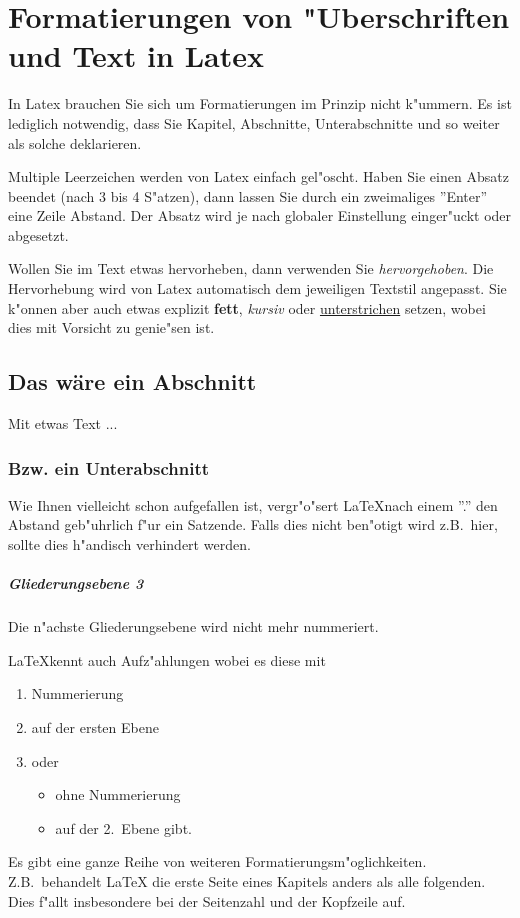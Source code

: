 \chapter[Formatierungen]{Formatierungen von "Uberschriften und Text in Latex}

In Latex brauchen Sie sich um Formatierungen im Prinzip nicht k"ummern. Es ist lediglich notwendig, dass Sie Kapitel, Abschnitte, Unterabschnitte und so weiter als solche deklarieren.

Multiple Leerzeichen        werden von Latex einfach gel"oscht. Haben Sie einen Absatz beendet (nach 3 bis 4 S"atzen), dann lassen Sie durch ein zweimaliges ''Enter'' eine Zeile Abstand. Der Absatz wird je nach globaler Einstellung einger"uckt oder abgesetzt.

Wollen Sie im Text etwas hervorheben, dann verwenden Sie \emph{hervorgehoben}. Die Hervorhebung wird von Latex automatisch dem jeweiligen Textstil angepasst. Sie k"onnen aber auch etwas explizit \textbf{fett}, \textit{kursiv} oder \underline{unterstrichen} setzen, wobei dies mit Vorsicht zu genie"sen ist.

\section[Abschnitt]{Das wäre ein Abschnitt}

Mit etwas Text ...

\subsection[Unterabschnitt]{Bzw. ein Unterabschnitt}

Wie Ihnen vielleicht schon aufgefallen ist, vergr"o"sert \LaTeX nach einem ''.'' den Abstand geb"uhrlich f"ur ein Satzende. Falls dies nicht ben"otigt wird z.B.~hier, sollte dies h"andisch verhindert werden.

\paragraph{Gliederungsebene 3} Die n"achste Gliederungsebene wird nicht mehr nummeriert.

\LaTeX kennt auch Aufz"ahlungen wobei es diese mit
\begin{enumerate}
\item Nummerierung
\item\label{enum-ebene} auf der ersten Ebene
\item oder
\begin{itemize}
\item ohne Nummerierung
\item auf der 2.~Ebene gibt.
\end{itemize}
\end{enumerate}
Es gibt eine ganze Reihe von weiteren Formatierungsm"oglichkeiten. Z.B.~behandelt {\LaTeX} die erste Seite eines Kapitels anders als alle folgenden. Dies f"allt insbesondere bei der Seitenzahl und der Kopfzeile auf.
